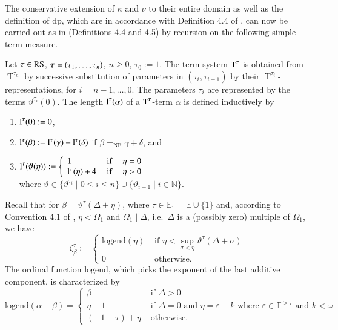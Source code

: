 \documentclass[3p,10pt,times]{elsarticle}
\newcommand{\al}{\alpha}
\newcommand{\be}{\beta}
\newcommand{\ga}{\gamma}
\newcommand{\de}{\delta}
\newcommand{\De}{\Delta}
\newcommand{\eps}{\varepsilon}
\newcommand{\om}{\omega}
\newcommand{\Om}{\Omega}
\newcommand{\tauvec}{{\vec{\tau}}}
\newcommand{\taui}{{\tau_i}}
\newcommand{\tauie}{{\tau_{i+1}}}
\newcommand{\si}{\sigma}
\newcommand{\tht}{\vartheta}
\newcommand{\ze}{\zeta}
\newcommand{\N}{{\mathbb N}}
\newcommand{\Ez}{{\mathbb E}}
\newcommand{\Ezone}{{\mathbb E}_1}
\newcommand{\NF}{{\mathrm{\scriptscriptstyle{NF}}}}
\newcommand{\logend}{{\mathrm{logend}}}
\newcommand{\thtt}{\tht^\tau}
\newcommand{\thtti}{\tht^\taui}
\newcommand{\Ttn}{{\operatorname{T}^{\tau_n}}}
\newcommand{\Tti}{{\operatorname{T}^{\taui}}}
\newcommand{\Ttvec}{{\operatorname{T}^\tauvec}}
\newcommand{\ltvec}{{\operatorname{l}^\tauvec}}
\newcommand{\zetal}{{\ze^\tau_\al}}
\newcommand{\zetbe}{{\ze^\tau_\be}}
\newcommand{\RS}{\mathrm{RS}}
\newcommand{\dpf}{\mathrm{dp}}
\def\vec#1{\mathchoice{\mbox{\boldmath$\displaystyle#1$}}
{\mbox{\boldmath$\textstyle#1$}}
{\mbox{\boldmath$\scriptstyle#1$}}
{\mbox{\boldmath$\scriptscriptstyle#1$}}}
\begin{document}
The conservative extension of $\kappa$ and $\nu$ to their entire domain as well as
the definition of $\dpf$\index{$\dpf$}, which are in accordance with Definition 4.4 of \cite{CWc}, can now be carried out as in 
\cite{W} (Definitions 4.4 and 4.5) by recursion on the following simple term measure.
\begin{defi}[4.3 of \cite{W}]\label{Ttauvec}\index{$\Ttvec$}
Let $\tauvec\in\RS$, $\tauvec=(\tau_1,\ldots,\tau_n)$, $n\ge0$, $\tau_0:=1$.
The term system $\Ttvec$ is obtained from $\Ttn$ by successive substitution of parameters in $(\taui,\tauie)$ by their $\Tti$-representations,
for $i=n-1,\ldots,0$. The parameters $\taui$ are represented by the terms $\thtti(0)$.
The length $\ltvec(\al)$\index{$\ltvec$} of a $\Ttvec$-term $\al$ is defined inductively by 
\begin{enumerate}
\item $\ltvec(0):=0$,
\item $\ltvec(\be):=\ltvec(\ga)+\ltvec(\de)$ if $\be=_\NF\ga+\de$, and 
\item $\ltvec(\tht(\eta)):=\left\{\begin{array}{l@{\quad}l}
1&\mbox{ if }\quad\eta=0\\
\ltvec(\eta)+4&\mbox{ if }\quad\eta>0
\end{array}\right.$\\[2mm] 
where $\tht\in\{\tht^{\tau_i}\mid 0\le i\le n\}\cup\{\tht_{i+1}\mid i\in\N\}$.
\end{enumerate}
\end{defi}
Recall that for $\be=\thtt(\De+\eta)$, where $\tau\in\Ezone=\Ez\cup\{1\}$ and, according to Convention 4.1 of \cite{W07a},
$\eta<\Om_1$ and $\Om_1\mid\De$, i.e.\ $\De$ is a (possibly zero) multiple of $\Om_1$, we have\index{$\zetal$}
\begin{equation}\label{zetaldefi}
\zetbe:=\left\{\begin{array}{ll}
                    \logend(\eta) & \mbox{ if } \eta<\sup_{\si<\eta}\thtt(\De+\si)\\
                    0 & \mbox{ otherwise.}
                 \end{array}\right.
\end{equation}
The ordinal function $\logend$\index{$\logend$}, which picks the exponent of the last additive component, is characterized by
\begin{equation}\label{logendchar}
  \logend(\al+\be)=\left\{\begin{array}{ll}
                      \be & \mbox{ if }\De>0\\
                      \eta+1 & \mbox{ if } \De=0 \mbox{ and } \eta=\eps+k\mbox{ where }\eps\in\Ez^{>\tau} \mbox{ and } k<\om\\
                      (-1+\tau)+\eta & \mbox{ otherwise.}
                      \end{array}\right.
\end{equation}
\end{document}
